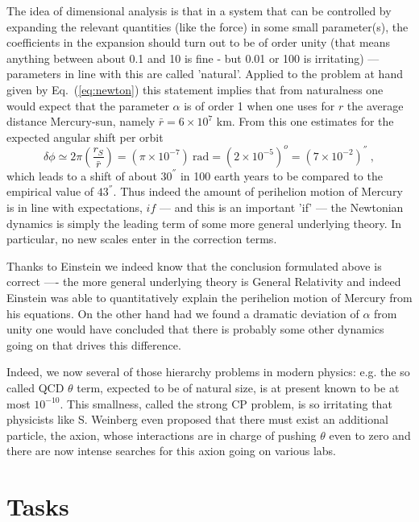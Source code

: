 \documentclass[12pt]{iopart}
\begin{document}
The idea of dimensional analysis is that in a system that can be controlled by expanding the relevant quantities
(like the force) in some small parameter(s), the coefficients in the expansion should turn out to be of order unity (that
means anything between about 0.1 and 10 is fine - but 0.01 or 100 is irritating) --- parameters in line with this
are called 'natural'. Applied to the problem at hand
given by Eq.~(\ref{eq:newton}) this statement implies that from naturalness one would expect that 
the parameter $\alpha$ is of order 1 when one uses
for $r$ the average distance Mercury-sun, namely $\bar r=6\times 10^7$ km.
From this one estimates for the expected angular shift per orbit
\begin{equation}
\delta \phi \simeq 2\pi\left(\frac{r_S}{\bar r}\right) = (\pi \times 10^{-7}) \ \mbox{rad} = (2\times 10^{-5})^o = (7\times 10^{-2}) ^{''} \ ,
\end{equation}
which leads to a shift of  about $30^{''}$ in 100 earth years to be compared to the empirical value of $43^{''}$.
 Thus indeed the
amount of perihelion motion of Mercury is in line with expectations, $if$ --- and this is an important 'if' ---
the Newtonian dynamics is simply the leading term of some more general underlying theory. In particular,
no new scales enter in the correction terms.

Thanks to Einstein we indeed know that the conclusion formulated above is correct ---- the more general underlying
theory is General Relativity and indeed Einstein was able to quantitatively explain the perihelion motion of Mercury
from his equations. 
On the other hand had we found a dramatic deviation of $\alpha$ from unity one would have concluded that 
there is probably some other dynamics going on that drives this difference.

Indeed, we now several of those hierarchy problems in modern physics: e.g. the so called QCD $\theta$ term,
expected to be of natural size, is at present known to be at most $10^{-10}$. This smallness, called the
strong CP problem, is so irritating that physicists like S. Weinberg even proposed that there must exist an
additional particle, the axion, whose interactions are in charge of pushing $\theta$ even to zero and there
are now intense searches for this axion going on various labs.



\section{Tasks}\label{sec:tasks}
\end{document}

